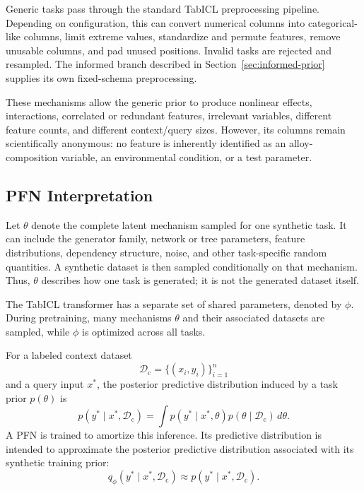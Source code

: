 \documentclass{article}
\begin{document}
Generic tasks pass through the standard TabICL preprocessing pipeline.
Depending on configuration, this can convert numerical columns into
categorical-like columns, limit extreme values, standardize and permute
features, remove unusable columns, and pad unused positions. Invalid tasks are
rejected and resampled. The informed branch described in
Section~\ref{sec:informed-prior} supplies its own fixed-schema preprocessing.

These mechanisms allow the generic prior to produce nonlinear effects,
interactions, correlated or redundant features, irrelevant variables,
different feature counts, and different context/query sizes. However, its
columns remain scientifically anonymous: no feature is inherently identified
as an alloy-composition variable, an environmental condition, or a test
parameter.

\subsection{PFN Interpretation}

Let \(\theta\) denote the complete latent mechanism sampled for one synthetic
task. It can include the generator family, network or tree parameters, feature
distributions, dependency structure, noise, and other task-specific random
quantities. A synthetic dataset is then sampled conditionally on that
mechanism. Thus, \(\theta\) describes how one task is generated; it is not the
generated dataset itself.

The TabICL transformer has a separate set of shared parameters, denoted by
\(\phi\). During pretraining, many mechanisms \(\theta\) and their associated
datasets are sampled, while \(\phi\) is optimized across all tasks.

For a labeled context dataset
\[
\mathcal{D}_{\mathrm{c}}=\{(x_i,y_i)\}_{i=1}^{n}
\]
and a query input \(x^\ast\), the posterior predictive distribution induced
by a task prior \(p(\theta)\) is
\begin{equation}
p(y^\ast\mid x^\ast,\mathcal{D}_{\mathrm{c}})
=\int p(y^\ast\mid x^\ast,\theta)
       p(\theta\mid\mathcal{D}_{\mathrm{c}})\,d\theta.
\label{eq:posterior-predictive}
\end{equation}
A PFN is trained to amortize this inference. Its predictive distribution is
intended to approximate the posterior predictive distribution associated with
its synthetic training prior:
\begin{equation}
q_{\phi}(y^\ast\mid x^\ast,\mathcal{D}_{\mathrm{c}})
\approx p(y^\ast\mid x^\ast,\mathcal{D}_{\mathrm{c}}).
\label{eq:pfn-approximation}
\end{equation}
\end{document}
